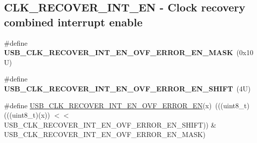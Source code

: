 \subsection*{C\+L\+K\+\_\+\+R\+E\+C\+O\+V\+E\+R\+\_\+\+I\+N\+T\+\_\+\+EN -\/ Clock recovery combined interrupt enable}
\begin{DoxyCompactItemize}
\item 
\mbox{\label{group___u_s_b___register___masks_ga4522f0e2c464556fc21d3494a3719bba}} 
\#define {\bfseries U\+S\+B\+\_\+\+C\+L\+K\+\_\+\+R\+E\+C\+O\+V\+E\+R\+\_\+\+I\+N\+T\+\_\+\+E\+N\+\_\+\+O\+V\+F\+\_\+\+E\+R\+R\+O\+R\+\_\+\+E\+N\+\_\+\+M\+A\+SK}~(0x10\+U)
\item 
\mbox{\label{group___u_s_b___register___masks_gac0a6612cb6c359ae682bfb2b642f6c6e}} 
\#define {\bfseries U\+S\+B\+\_\+\+C\+L\+K\+\_\+\+R\+E\+C\+O\+V\+E\+R\+\_\+\+I\+N\+T\+\_\+\+E\+N\+\_\+\+O\+V\+F\+\_\+\+E\+R\+R\+O\+R\+\_\+\+E\+N\+\_\+\+S\+H\+I\+FT}~(4\+U)
\item 
\#define \mbox{\hyperlink{group___u_s_b___register___masks_gadee3d160d114d4d4184cc6ed3dee1ca9}{U\+S\+B\+\_\+\+C\+L\+K\+\_\+\+R\+E\+C\+O\+V\+E\+R\+\_\+\+I\+N\+T\+\_\+\+E\+N\+\_\+\+O\+V\+F\+\_\+\+E\+R\+R\+O\+R\+\_\+\+EN}}(x)~(((uint8\+\_\+t)(((uint8\+\_\+t)(x)) $<$$<$ U\+S\+B\+\_\+\+C\+L\+K\+\_\+\+R\+E\+C\+O\+V\+E\+R\+\_\+\+I\+N\+T\+\_\+\+E\+N\+\_\+\+O\+V\+F\+\_\+\+E\+R\+R\+O\+R\+\_\+\+E\+N\+\_\+\+S\+H\+I\+FT)) \& U\+S\+B\+\_\+\+C\+L\+K\+\_\+\+R\+E\+C\+O\+V\+E\+R\+\_\+\+I\+N\+T\+\_\+\+E\+N\+\_\+\+O\+V\+F\+\_\+\+E\+R\+R\+O\+R\+\_\+\+E\+N\+\_\+\+M\+A\+SK)
\end{DoxyCompactItemize}
